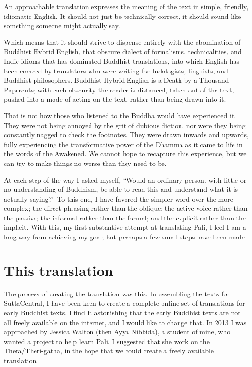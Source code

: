 \documentclass[10pt, openany]{book}
\begin{document}
An approachable translation expresses the meaning of the text in simple, friendly, idiomatic English. It should not just be technically correct, it should sound like something someone might actually say.

Which means that it should strive to dispense entirely with the abomination of Buddhist Hybrid English, that obscure dialect of formalisms, technicalities, and Indic idioms that has dominated Buddhist translations, into which English has been coerced by translators who were writing for Indologists, linguists, and Buddhist philosophers. Buddhist Hybrid English is a Death by a Thousand Papercuts; with each obscurity the reader is distanced, taken out of the text, pushed into a mode of acting on the text, rather than being drawn into it.

That is not how those who listened to the Buddha would have experienced it. They were not being annoyed by the grit of dubious diction, nor were they being constantly nagged to check the footnotes. They were drawn inwards and upwards, fully experiencing the transformative power of the Dhamma as it came to life in the words of the Awakened. We cannot hope to recapture this experience, but we can try to make things no worse than they need to be.

At each step of the way I asked myself, “Would an ordinary person, with little or no understanding of Buddhism, be able to read this and understand what it is actually saying?” To this end, I have favored the simpler word over the more complex; the direct phrasing rather than the oblique; the active voice rather than the passive; the informal rather than the formal; and the explicit rather than the implicit. With this, my first substantive attempt at translating Pali, I feel I am a long way from achieving my goal; but perhaps a few small steps have been made.

\section*{This translation}

The process of creating the translation was this. In assembling the texts for SuttaCentral, I have been keen to create a complete online set of translations for early Buddhist texts. I find it astonishing that the early Buddhist texts are not all freely available on the internet, and I would like to change that. In 2013 I was approached by Jessica Walton (then Ayyā Nibbidā), a student of mine, who wanted a project to help learn Pali. I suggested that she work on the Thera/Theri-gāthā, in the hope that we could create a freely available translation.
\end{document}
